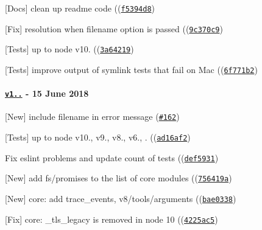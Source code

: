 \begin{DoxyItemize}
\item \mbox{[}Docs\mbox{]} clean up readme code ((\href{https://github.com/browserify/resolve/commit/f5394d801350ff32be08dfc5ca37bcb677b4c08b}{\tt {\ttfamily f5394d8}})
\item \mbox{[}Fix\mbox{]} resolution when {\ttfamily filename} option is passed ((\href{https://github.com/browserify/resolve/commit/9c370c9848eaecb36fb8e0b004930e2dd49e1e71}{\tt {\ttfamily 9c370c9}})
\item \mbox{[}Tests\mbox{]} up to {\ttfamily node} {\ttfamily v10.} ((\href{https://github.com/browserify/resolve/commit/3a64219a7385d5d51f3d4ff7b3de0ce749d6cf09}{\tt {\ttfamily 3a64219}})
\item \mbox{[}Tests\mbox{]} improve output of symlink tests that fail on Mac ((\href{https://github.com/browserify/resolve/commit/6f771b215b4f40b0ba0009ef564bde85212e79eb}{\tt {\ttfamily 6f771b2}})
\end{DoxyItemize}

\paragraph*{\href{https://github.com/browserify/resolve/compare/v1.7.1...v1.8.0}{\tt v1..} -\/ 15 June 2018}


\begin{DoxyItemize}
\item \mbox{[}New\mbox{]} include filename in error message (\href{https://github.com/browserify/resolve/pull/162}{\tt {\ttfamily \#162}})
\item \mbox{[}Tests\mbox{]} up to {\ttfamily node} {\ttfamily v10.}, {\ttfamily v9.}, {\ttfamily v8.}, {\ttfamily v6.}, {.} ((\href{https://github.com/browserify/resolve/commit/ad16af2f4f6eb1dc964f5b119f6d94bd64b2607a}{\tt {\ttfamily ad16af2}})
\item Fix eslint problems and update count of tests ((\href{https://github.com/browserify/resolve/commit/def59317704d787adcddc9695b923e65c6bf5232}{\tt {\ttfamily def5931}})
\item \mbox{[}New\mbox{]} add fs/promises to the list of core modules ((\href{https://github.com/browserify/resolve/commit/756419a94432fd753a62f5a58b797776efb543f9}{\tt {\ttfamily 756419a}})
\item \mbox{[}New\mbox{]} core\+: add {\ttfamily trace\+\_\+events}, {\ttfamily v8/tools/arguments} ((\href{https://github.com/browserify/resolve/commit/bae033824c82153ccb4f32abdd0e70ca677968bc}{\tt {\ttfamily bae0338}})
\item \mbox{[}Fix\mbox{]} core\+: {\ttfamily \+\_\+tls\+\_\+legacy} is removed in node 10 ((\href{https://github.com/browserify/resolve/commit/4225ac5f4b90d26db664ed32f5b08416fea69b86}{\tt {\ttfamily 4225ac5}})
\end{DoxyItemize}

